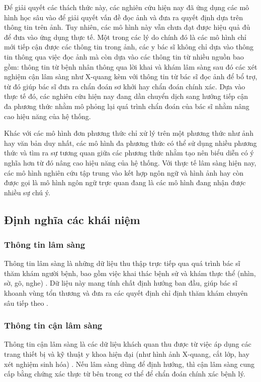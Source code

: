   Để giải quyết các thách thức này, các nghiên cứu hiện nay đã ứng dụng các mô hình học sâu vào để giải quyết vấn đề đọc ảnh và đưa ra quyết định dựa trên thông tin trên ảnh. Tuy nhiên, các mô hình này vẫn chưa đạt được hiệu quả đủ để đưa vào ứng dụng thực tế. Một trong các lý do chính đó là các mô hình chỉ mới tiếp cận được các thông tin trong ảnh, các y bác sĩ không chỉ dựa vào thông tin thông qua việc đọc ảnh mà còn dựa vào các thông tin từ nhiều nguồn bao gồm: thông tin từ bệnh nhân thông qua lời khai và khám lâm sàng sau đó các xét nghiệm cận lâm sàng như X-quang kèm với thông tin từ bác sĩ đọc ảnh để bổ trợ, từ đó giúp bác sĩ đưa ra chẩn đoán sơ khởi hay chẩn đoán chính xác. Dựa vào thực tế đó, các nghiên cứu hiện nay đang dần chuyển dịch sang hướng tiếp cận đa phương thức nhằm mô phỏng lại quá trình chẩn đoán của bác sĩ nhằm nâng cao hiệu năng của hệ thống.

  Khác với các mô hình đơn phương thức chỉ xử lý trên một phương thức như ảnh hay văn bản duy nhất, các mô hình đa phương thức có thể sử dụng nhiều phương thức và tìm ra sự tương quan giữa các phương thức nhằm tạo nên biểu diễn có ý nghĩa hơn từ đó nâng cao hiệu năng của hệ thống. Với thực tế lâm sàng hiện nay, các mô hình nghiên cứu tập trung vào kết hợp ngôn ngữ và hình ảnh hay còn được gọi là mô hình ngôn ngữ trực quan đang là các mô hình đang nhận được nhiều sự chú ý. 

  \subsection{Định nghĩa các khái niệm}
  \subsubsection{Thông tin lâm sàng}
  Thông tin lâm sàng là những dữ liệu thu thập trực tiếp qua quá trình bác sĩ thăm khám người bệnh, bao gồm việc khai thác bệnh sử và khám thực thể (nhìn, sờ, gõ, nghe) \cite{Dorland2011}. Dữ liệu này mang tính chất định hướng ban đầu, giúp bác sĩ khoanh vùng tổn thương và đưa ra các quyết định chỉ định thăm khám chuyên sâu tiếp theo \cite{Bickley2020_Bates}.
  \subsubsection{Thông tin cận lâm sàng}
  Thông tin cận lâm sàng là các dữ liệu khách quan thu được từ việc áp dụng các trang thiết bị và kỹ thuật y khoa hiện đại (như hình ảnh X-quang, cắt lớp, hay xét nghiệm sinh hóa) \cite{Dorland2011}. Nếu lâm sàng dùng để định hướng, thì cận lâm sàng cung cấp bằng chứng xác thực từ bên trong cơ thể để chẩn đoán chính xác bệnh lý.

